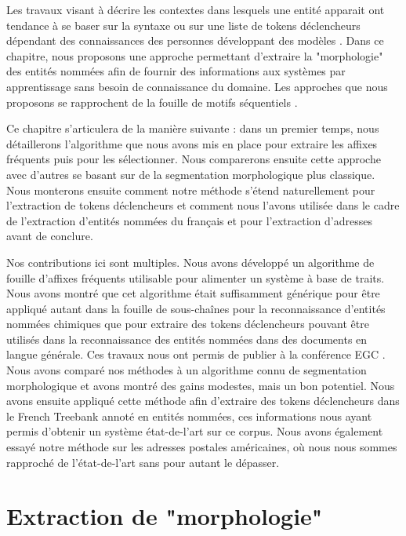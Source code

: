 \documentclass[12pt,a4paper,times,twoside,openright]{report}
\begin{document}
Les travaux visant à décrire les contextes dans lesquels une entité apparait ont tendance à se baser sur la syntaxe \citep{holat2016fouille} ou sur une liste de tokens déclencheurs dépendant des connaissances des personnes développant des modèles \citep{leaman2013ncbi}. Dans ce chapitre, nous proposons une approche permettant d'extraire la "morphologie" des entités nommées afin de fournir des informations aux systèmes par apprentissage sans besoin de connaissance du domaine. Les approches que nous proposons se rapprochent de la fouille de motifs séquentiels \citep{agrawal1995mining,cellier2010fouille}.

Ce chapitre s'articulera de la manière suivante : dans un premier temps, nous détaillerons l'algorithme que nous avons mis en place pour extraire les affixes fréquents puis pour les sélectionner. Nous comparerons ensuite cette approche avec d'autres se basant sur de la segmentation morphologique plus classique. Nous monterons ensuite comment notre méthode s'étend naturellement pour l'extraction de tokens déclencheurs et comment nous l'avons utilisée dans le cadre de l'extraction d'entités nommées du français et pour l'extraction d'adresses avant de conclure.

Nos contributions ici sont multiples. Nous avons développé un algorithme de fouille d'affixes fréquents utilisable pour alimenter un système à base de traits. Nous avons montré que cet algorithme était suffisamment générique pour être appliqué autant dans la fouille de sous-chaînes pour la reconnaissance d'entités nommées chimiques que pour extraire des tokens déclencheurs pouvant être utilisés dans la reconnaissance des entités nommées dans des documents en langue générale. Ces travaux nous ont permis de publier à la conférence EGC \citep{dupont2016extraction}. Nous avons comparé nos méthodes à un algorithme connu de segmentation morphologique et avons montré des gains modestes, mais un bon potentiel. Nous avons ensuite appliqué cette méthode afin d'extraire des tokens déclencheurs dans le French Treebank annoté en entités nommées, ces informations nous ayant permis d'obtenir un système état-de-l'art sur ce corpus. Nous avons également essayé notre méthode sur les adresses postales américaines, où nous nous sommes rapproché de l'état-de-l'art sans pour autant le dépasser.


    
    \section{Extraction de "morphologie"}
    \label{sec:morphology-extraction}
\end{document}
